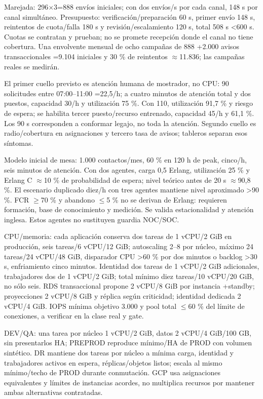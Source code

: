 \documentclass[11pt,letterpaper]{report}
\begin{document}
Marejada: 296$\times$3=888 envíos iniciales; con dos envíos/s por cada canal, 148 s por canal simultáneo. Presupuesto: verificación/preparación 60 s, primer envío 148 s, reintentos de cuota/falla 180 s y revisión/escalamiento 120 s, total 508 s <600 s. Cuotas se contratan y prueban; no se promete recepción donde el canal no tiene cobertura. Una envolvente mensual de ocho campañas de 888 +2.000 avisos transaccionales =9.104 iniciales y 30 \% de reintentos $\approx$11.836; las campañas reales se medirán.

El primer cuello previsto es atención humana de mostrador, no CPU: 90 solicitudes entre 07:00--11:00 =22,5/h; a cuatro minutos de atención total y dos puestos, capacidad 30/h y utilización 75 \%. Con 110, utilización 91,7 \% y riesgo de espera; se habilita tercer puesto/recurso entrenado, capacidad 45/h y 61,1 \%. Los 90 s corresponden a conformar legajo, no toda la atención. Segundo cuello es radio/cobertura en asignaciones y tercero tasa de avisos; tableros separan esos síntomas.

Modelo inicial de mesa: 1.000 contactos/mes, 60 \% en 120 h de peak, cinco/h, seis minutos de atención. Con dos agentes, carga 0,5 Erlang, utilización 25 \% y Erlang C $\approx$10 \% de probabilidad de espera; nivel teórico antes de 20 s $\approx$90,8 \%. El escenario duplicado diez/h con tres agentes mantiene nivel aproximado >90 \%. FCR $\geq$70 \% y abandono $\leq$5 \% no se derivan de Erlang: requieren formación, base de conocimiento y medición. Se valida estacionalidad y atención inglesa. Estos agentes no sustituyen guardia NOC/SOC.

CPU/memoria: cada aplicación conserva dos tareas de 1 vCPU/2 GiB en producción, seis tareas/6 vCPU/12 GiB; autoscaling 2--8 por núcleo, máximo 24 tareas/24 vCPU/48 GiB, disparador CPU >60 \% por dos minutos o backlog >30 s, enfriamiento cinco minutos. Identidad dos tareas de 1 vCPU/2 GiB adicionales, trabajadores dos de 1 vCPU/2 GiB; total mínimo diez tareas/10 vCPU/20 GiB, no sólo seis. RDS transaccional propone 2 vCPU/8 GiB por instancia +standby; proyecciones 2 vCPU/8 GiB y réplica según criticidad; identidad dedicada 2 vCPU/4 GiB. IOPS mínima objetivo 3.000 y pool total $\leq$60 \% del límite de conexiones, a verificar en la clase real y gate.

DEV/QA: una tarea por núcleo 1 vCPU/2 GiB, datos 2 vCPU/4 GiB/100 GB, sin presentarlos HA; PREPROD reproduce mínimo/HA de PROD con volumen sintético. DR mantiene dos tareas por núcleo a mínima carga, identidad y trabajadores activos en espera, réplicas/objetos listos; escala al mismo mínimo/techo de PROD durante conmutación. GCP usa asignaciones equivalentes y límites de instancias acordes, no multiplica recursos por mantener ambas alternativas contratadas.
\end{document}
